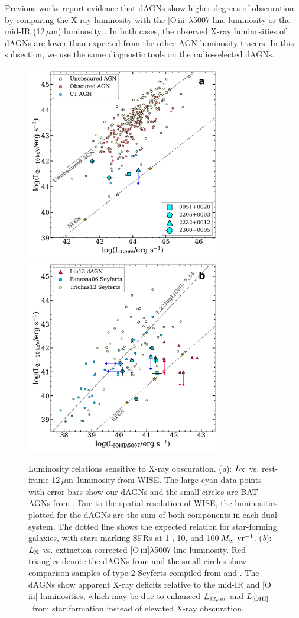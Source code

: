 \documentclass[iop,revtex4,twocolumn,apj,numberedappendix,appendixfloats]{emulateapj}
\newcommand{\msunyr}{$M_{\odot}~{\rm yr}^{-1}$}
\newcommand{\um}{$\mu$m}
\newcommand{\lmir}{$L_{\rm 12\mu m}$}
\newcommand{\loiii}{$L_{\rm [OIII]}$}
\begin{document}
Previous works report evidence that dAGNs show higher degrees of obscuration by comparing the X-ray luminosity with the [O\,{\sc iii}]\,$\lambda$5007 line luminosity \citep{Liu13a} or the mid-IR (12\,\um) luminosity \citep{Satyapal17}. In both cases, the observed X-ray luminosities of dAGNs are lower than expected from the other AGN luminosity tracers. In this subsection, we use the same diagnostic tools on the radio-selected dAGNs. 

\begin{figure}
\includegraphics[width=8.5cm]{figs/Lx-Lir_rest.pdf}
\includegraphics[width=8.5cm]{figs/Lx-L[OIII]unabs.pdf}
\caption{Luminosity relations sensitive to X-ray obscuration. 
%
({\it a}): $L_{\rm X}$ vs. rest-frame 12\,\um\ luminosity from WISE. The large cyan data points with error bars show our dAGNs and the small circles are BAT AGNs from \citet{Ricci15}. Due to the spatial resolution of WISE, the luminosities plotted for the dAGNs are the sum of both components in each dual system. The dotted line shows the expected relation for star-forming galaxies, with stars marking SFRs at 1 , 10, and 100\,\msunyr. 
%
({\it b}): $L_{\rm X}$ vs. extinction-corrected [O\,{\sc iii}]$\lambda$5007 line luminosity. Red triangles denote the dAGNs from \citet{Liu13} and the small circles show comparison samples of type-2 Seyferts compiled from \citet{Panessa06} and \citet{Trichas13}. 
%
The dAGNs show apparent X-ray deficits relative to the mid-IR and [O\,{\sc iii}] luminosities, which may be due to enhanced \lmir\ and \loiii\ from star formation instead of elevated X-ray obscuration.
}
\label{fig:LxLir}
\end{figure}
\end{document}
